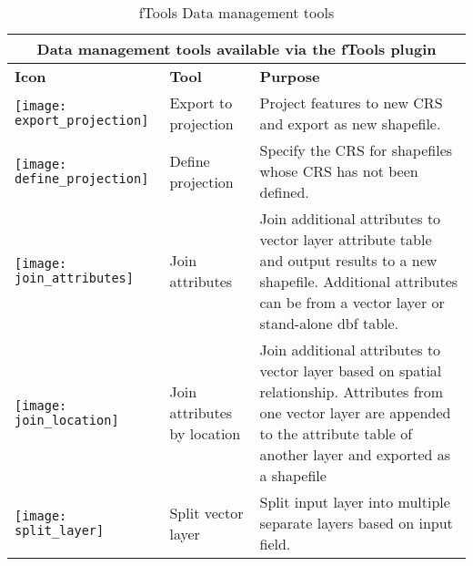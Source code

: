\begin{table}[ht]
\centering
\caption{fTools Data management tools}\label{tab:fTool_data_management}\medskip
 \begin{tabular}{|p{0.3in}|p{1.3in}|p{4.6in}|}
 \hline \multicolumn{3}{|c|}{\textbf{Data management tools available via the fTools plugin}} \\
 \hline \textbf{Icon} & \textbf{Tool} & \textbf{Purpose} \\
 \hline \texttt{[image: export\_projection]} & Export to projection & 
Project features to new CRS and export as new shapefile. \\
 \hline \texttt{[image: define\_projection]} & Define projection & 
Specify the CRS for shapefiles whose CRS has not been defined. \\
 \hline \texttt{[image: join\_attributes]} & Join attributes & Join 
additional attributes to vector layer attribute table and output results 
to a new shapefile. Additional attributes can be from a vector layer or 
stand-alone dbf table. \\
 \hline \texttt{[image: join\_location]} & Join attributes by 
location & Join additional attributes to vector layer based on spatial 
relationship. Attributes from one vector layer are appended to the attribute 
table of another layer and exported as a shapefile \\
 \hline \texttt{[image: split\_layer]} & Split vector layer & 
Split input layer into multiple separate layers based on input field. \\
 \hline
\end{tabular}
\end{table}



